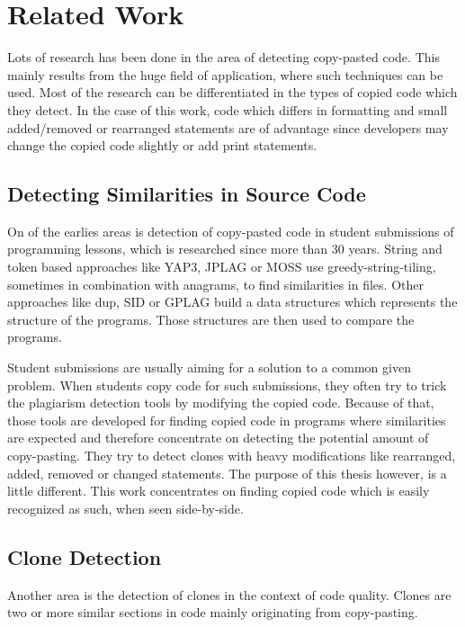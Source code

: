 
\chapter{Related Work}\label{chapter:related_work}
Lots of research has been done in the area of detecting copy-pasted code.
This mainly results from the huge field of application, where such techniques can be used.
Most of the research can be differentiated in the types of copied code which they detect.
In the case of this work, code which differs in formatting and small added/removed or rearranged statements are of advantage since developers may change the copied code slightly or add print statements.

\section{Detecting Similarities in Source Code}\label{section:related_work/detecting_similarities}
On of the earlies areas is detection of copy-pasted code in student submissions of programming lessons, which is researched since more than 30 years\cite{lancaster2004comparison}.
String and token based approaches like YAP3\cite{wise1996yap3}, JPLAG\cite{prechelt2002finding} or MOSS\cite{schleimer2003winnowing} use greedy-string-tiling, sometimes in combination with anagrams, to find similarities in files.
Other approaches like dup\cite{baker1995finding}, SID\cite{chen2004shared} or GPLAG\cite{liu2006gplag} build a data structures which represents the structure of the programs.
Those structures are then used to compare the programs.

Student submissions are usually aiming for a solution to a common given problem.
When students copy code for such submissions, they often try to trick the plagiarism detection tools by modifying the copied code.
Because of that, those tools are developed for finding copied code in programs where similarities are expected and therefore concentrate on detecting the potential amount of copy-pasting.
They try to detect clones with heavy modifications like rearranged, added, removed or changed statements.
The purpose of this thesis however, is a little different.
This work concentrates on finding copied code which is easily recognized as such, when seen side-by-side.

\section{Clone Detection}\label{section:related_work/clone_detection}
Another area is the detection of clones in the context of code quality.
Clones are two or more similar sections in code mainly originating from copy-pasting.

